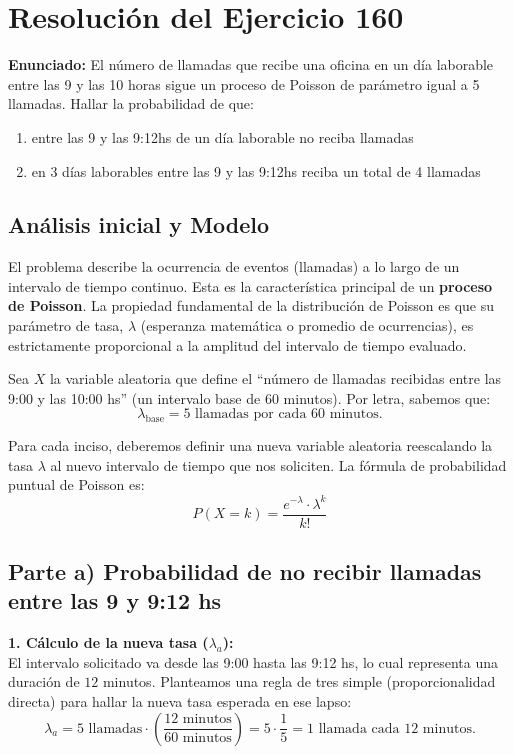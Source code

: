 \documentclass[11pt, a4paper]{article}
\begin{document}
\section*{Resolución del Ejercicio 160}

\textbf{Enunciado:} El número de llamadas que recibe una oficina en un día laborable entre las 9 y las 10 horas sigue un proceso de Poisson de parámetro igual a 5 llamadas. Hallar la probabilidad de que:
\begin{enumerate}[label=\alph*)]
    \item entre las 9 y las 9:12hs de un día laborable no reciba llamadas
    \item en 3 días laborables entre las 9 y las 9:12hs reciba un total de 4 llamadas
\end{enumerate}

\vspace{0.5cm}

\subsection*{Análisis inicial y Modelo}

El problema describe la ocurrencia de eventos (llamadas) a lo largo de un intervalo de tiempo continuo. Esta es la característica principal de un \textbf{proceso de Poisson}. La propiedad fundamental de la distribución de Poisson es que su parámetro de tasa, $\lambda$ (esperanza matemática o promedio de ocurrencias), es estrictamente proporcional a la amplitud del intervalo de tiempo evaluado.

Sea $X$ la variable aleatoria que define el ``número de llamadas recibidas entre las 9:00 y las 10:00 hs'' (un intervalo base de $60$ minutos). Por letra, sabemos que:
\[ \lambda_{\text{base}} = 5 \text{ llamadas por cada } 60 \text{ minutos.} \]

Para cada inciso, deberemos definir una nueva variable aleatoria reescalando la tasa $\lambda$ al nuevo intervalo de tiempo que nos soliciten. La fórmula de probabilidad puntual de Poisson es:
\[ P(X = k) = \frac{e^{-\lambda} \cdot \lambda^k}{k!} \]

\vspace{0.5cm}

\subsection*{Parte a) Probabilidad de no recibir llamadas entre las 9 y 9:12 hs}

\textbf{1. Cálculo de la nueva tasa ($\lambda_a$):} \\
El intervalo solicitado va desde las 9:00 hasta las 9:12 hs, lo cual representa una duración de $12$ minutos. 
Planteamos una regla de tres simple (proporcionalidad directa) para hallar la nueva tasa esperada en ese lapso:
\[ \lambda_a = 5 \text{ llamadas} \cdot \left( \frac{12 \text{ minutos}}{60 \text{ minutos}} \right) = 5 \cdot \frac{1}{5} = 1 \text{ llamada cada } 12 \text{ minutos.} \]
\end{document}
